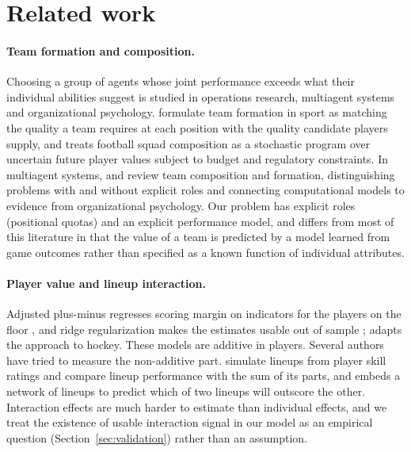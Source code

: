 \section{Related work}
\label{sec:related}

\paragraph{Team formation and composition.} Choosing a group of agents whose joint performance exceeds what their individual abilities suggest is studied in operations research, multiagent systems and organizational psychology. \citet{boon2003} formulate team formation in sport as matching the quality a team requires at each position with the quality candidate players supply, and \citet{pantuso2017} treats football squad composition as a stochastic program over uncertain future player values subject to budget and regulatory constraints. In multiagent systems, \citet{andrejczuk2016} and \citet{andrejczuk2018} review team composition and formation, distinguishing problems with and without explicit roles and connecting computational models to evidence from organizational psychology. Our problem has explicit roles (positional quotas) and an explicit performance model, and differs from most of this literature in that the value of a team is predicted by a model learned from game outcomes rather than specified as a known function of individual attributes.

\paragraph{Player value and lineup interaction.} Adjusted plus-minus regresses scoring margin on indicators for the players on the floor \citep{rosenbaum2004}, and ridge regularization makes the estimates usable out of sample \citep{sill2010}; \citet{macdonald2011} adapts the approach to hockey. These models are additive in players. Several authors have tried to measure the non-additive part. \citet{maymin2013} simulate lineups from player skill ratings and compare lineup performance with the sum of its parts, and \citet{pelechrinis2018} embeds a network of lineups to predict which of two lineups will outscore the other. Interaction effects are much harder to estimate than individual effects, and we treat the existence of usable interaction signal in our model as an empirical question (Section~\ref{sec:validation}) rather than an assumption.

